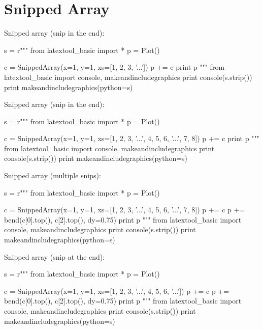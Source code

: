 \section{Snipped Array}


\begin{samepage}
Snipped array (snip in the end):
\begin{python}
s = r"""
from latextool_basic import *
p = Plot()

c = SnippedArray(x=1, y=1, xs=[1, 2, 3, '...'])
p += c
print p
"""
from latextool_basic import console, makeandincludegraphics
print console(s.strip())
print makeandincludegraphics(python=s)
\end{python}
\end{samepage}



\begin{samepage}
Snipped array (snip in the end):
\begin{python}
s = r"""
from latextool_basic import *
p = Plot()

c = SnippedArray(x=1, y=1, xs=[1, 2, 3, '...', 4, 5, 6, '...', 7, 8])
p += c
print p
"""
from latextool_basic import console, makeandincludegraphics
print console(s.strip())
print makeandincludegraphics(python=s)
\end{python}
\end{samepage}





\begin{samepage}
Snipped array (multiple snips):
\begin{python}
s = r"""
from latextool_basic import *
p = Plot()

c = SnippedArray(x=1, y=1, xs=[1, 2, 3, '...', 4, 5, 6, '...', 7, 8])
p += c
p += bend(c[0].top(), c[2].top(), dy=0.75)
print p
"""
from latextool_basic import console, makeandincludegraphics
print console(s.strip())
print makeandincludegraphics(python=s)
\end{python}
\end{samepage}



\begin{samepage}
Snipped array (snip at the end):
\begin{python}
s = r"""
from latextool_basic import *
p = Plot()

c = SnippedArray(x=1, y=1, xs=[1, 2, 3, '...', 4, 5, 6, '...'])
p += c
p += bend(c[0].top(), c[2].top(), dy=0.75)
print p
"""
from latextool_basic import console, makeandincludegraphics
print console(s.strip())
print makeandincludegraphics(python=s)
\end{python}
\end{samepage}


